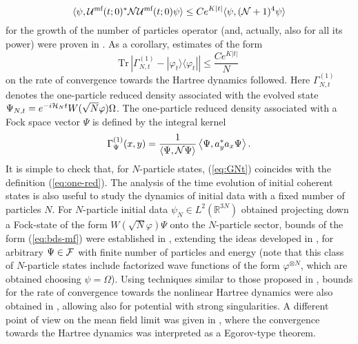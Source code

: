 \documentclass[11pt,a4paper]{article}
\newcommand{\cU}{{\cal U}}
\newcommand{\bR}{{\mathbb R}}
\newcommand{\tr}{\mbox{Tr}}
\newcommand{\cF}{{\cal F}}
\newcommand{\cH}{{\cal H}}
\newcommand{\cN}{{\cal N}}
\begin{document}
\[ \langle \psi , \cU^{\text{mf}} (t;0)^* \cN \cU^{\text{mf}} (t;0) \psi \rangle \leq C e^{K |t|} \langle \psi, (\cN+1)^{4} \psi \rangle \]
for the growth of the number of particles operator (and, actually, also for all its power) were proven in \cite{RS}. As a corollary, estimates of the form
\begin{equation}\label{eq:bds-mf} \tr \, \left| \Gamma_{N,t}^{(1)} - |\varphi_t \rangle \langle \varphi_t| \right| \leq \frac{C e^{K|t|}}{N} \,  \end{equation}
on the rate of convergence towards the Hartree dynamics followed. Here $\Gamma_{N,t}^{(1)}$ denotes the one-particle reduced density associated with the evolved state $\Psi_{N,t} = e^{-i\cH_N t} W(\sqrt{N} \varphi) \Omega$. The one-particle reduced density associated with a Fock space vector $\Psi$ is defined by the integral kernel
\begin{equation}\label{eq:GNt} \Gamma_{\Psi}^{(1)} (x,y) = \frac{1}{\langle
\Psi , \cN \Psi \rangle} \left\langle \Psi , a_y^* a_x \Psi \right\rangle. \end{equation}
It is simple to check that, for $N$-particle states, (\ref{eq:GNt}) coincides with the definition (\ref{eq:one-red}). 
The analysis of the time evolution of initial coherent states is also useful to study the dynamics of initial data with a fixed number of particles $N$. For $N$-particle initial data $\psi_N \in L^2 (\bR^{3N})$ obtained projecting down a Fock-state of the form $W(\sqrt{N} \varphi) \Psi$ onto the $N$-particle sector, bounds of the form (\ref{eq:bds-mf}) were established in \cite{CLS}, extending the ideas developed in \cite{RS}, for arbitrary $\Psi \in \cF$ with finite number of particles and energy (note that this class of $N$-particle states include factorized wave functions of the form $\varphi^{\otimes N}$, which are obtained choosing $\psi = \Omega$). Using techniques similar to those proposed in \cite{P}, bounds for the rate of convergence towards the nonlinear Hartree dynamics were also obtained in \cite{KP2009}, allowing also for potential with strong singularities. A different point of view on the mean field limit was given in \cite{FKS}, where the convergence towards the Hartree dynamics was interpreted as a Egorov-type theorem.

\bigskip
\end{document}
